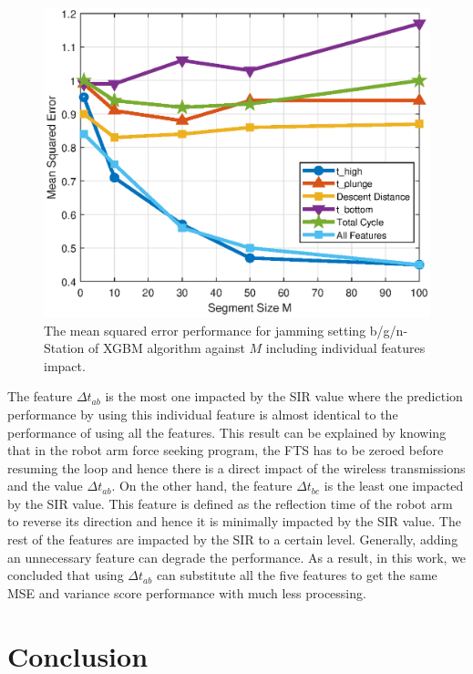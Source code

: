 		\begin{figure}[tbp]
	    \centering
		\includegraphics[width=0.9\columnwidth]{./chapter-ftml/plots/004_MSE_F_3.eps}
		\caption{The mean squared error performance for jamming setting b/g/n-Station of XGBM algorithm against $M$ including individual features impact.}
		\label{fig:004_MSE_F_3}      
	\end{figure}
	
	The feature $\Delta{t}_{ab}$ is the most one impacted by the SIR value where the prediction performance by using this individual feature is almost identical to the performance of using all the features. This result can be explained by knowing that in the robot arm force seeking program, the FTS has to be zeroed before resuming the loop and hence there is a direct impact of the wireless transmissions and the value $\Delta{t}_{ab}$. On the other hand, the feature $\Delta{t}_{bc}$ is the least one impacted by the SIR value. This feature is defined as the reflection time of the robot arm to reverse its direction and hence it is minimally impacted by the SIR value. The rest of the features are impacted by the SIR to a certain level. Generally, adding an unnecessary feature can degrade the performance. As a result, in this work, we concluded that using $\Delta{t}_{ab}$ can substitute all the five features to get the same MSE and variance score performance with much less processing.

	\section{Conclusion}\label{sec:conclusion}
	
